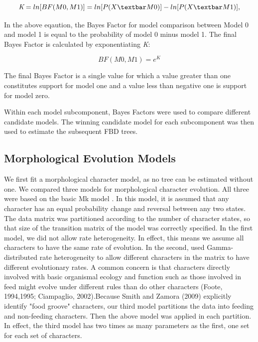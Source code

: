 \documentclass{article}
\begin{document}
\begin{center}
  \[  \textit{K}=ln[BF(M0,M1)]=ln[P(X \textbar M0)] - ln[P(X \textbar M1)],  \]
\end{center}    
    
In the above eqaution, the Bayes Factor for model comparison between Model 0 and model 1 is equal to the probability of model 0 minus model 1. The final Bayes Factor is calculated by exponentiating \textit{K}:

\begin{center}
  \[  BF(M0,M1)=\textit{e}^\textit{K} \]
\end{center}

The final Bayes Factor is a single value for which a value greater than one constitutes support for model one and a value less than negative one is support for model zero. 

 Within each model subcomponent, Bayes Factors were used to compare different candidate models. 
The winning candidate model for each subcomponent was then used to estimate the subsequent FBD trees.

\subsection{Morphological Evolution Models}
We first fit a morphological character model, as no tree can be estimated without one.
We compared three models for morphological character evolution. 
All three were based on the basic Mk model \citep{Lewis2001}. 
In this model, it is assumed that any character has an equal probability change and reversal between any two states. 
The data matrix was partitioned according to the number of character states, so that size of the transition matrix of the model was correctly specified.
In the first model, we did not allow rate heterogeneity. 
In effect, this means we assume all characters to have the same rate of evolution.
In the second, used Gamma-distributed rate heterogeneity to allow different characters in the matrix to have different evolutionary rates.
A common concern is that characters directly involved with basic organismal ecology and function such as those involved in feed might evolve under different rules than do other characters (Foote, 1994,1995; Ciampaglio, 2002).Because Smith and Zamora (2009) explicitly identify "food groove" characters, our third model partitions the data into feeding and non-feeding characters.
Then the above model was applied in each partition.
In effect, the third model has two times as many parameters as the first, one set for each set of characters.
\end{document}

